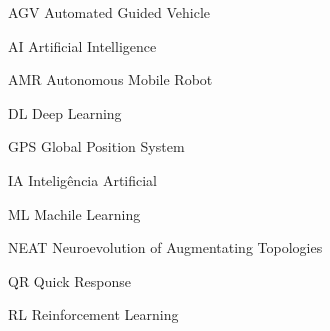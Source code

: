 \begin{siglas}
    \item[AGV] Automated Guided Vehicle
    \item[AI] Artificial Intelligence
    \item[AMR] Autonomous Mobile Robot
    \item[DL] Deep Learning
    \item[GPS] Global Position System
    \item[IA] Intelig{\^e}ncia Artificial
    \item[ML] Machile Learning
    \item[NEAT] Neuroevolution of Augmentating Topologies
    \item[QR] Quick Response
    \item[RL] Reinforcement Learning
\end{siglas}
